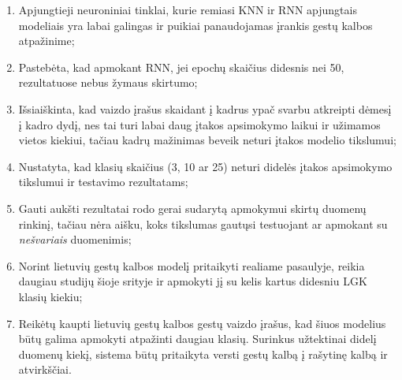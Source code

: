\documentclass{VUMIFPSbakalaurinis}
\begin{document}
\begin{enumerate}
	\item Apjungtieji neuroniniai tinklai, kurie remiasi KNN ir RNN apjungtais modeliais yra labai galingas ir puikiai panaudojamas įrankis gestų kalbos atpažinime;
	\item Pastebėta, kad apmokant RNN, jei epochų skaičius didesnis nei 50, rezultatuose nebus žymaus skirtumo;
	\item Išsiaiškinta, kad vaizdo įrašus skaidant į kadrus ypač svarbu atkreipti dėmesį į kadro dydį, nes tai turi labai daug įtakos apsimokymo laikui ir užimamos vietos kiekiui, tačiau kadrų mažinimas beveik neturi įtakos modelio tikslumui;
	\item Nustatyta, kad klasių skaičius (3, 10 ar 25) neturi didelės įtakos apsimokymo tikslumui ir testavimo rezultatams;
	\item Gauti aukšti rezultatai rodo gerai sudarytą apmokymui skirtų duomenų rinkinį, tačiau nėra aišku, koks tikslumas gautųsi testuojant ar apmokant su \textit{nešvariais} duomenimis;
	\item Norint lietuvių gestų kalbos modelį pritaikyti realiame pasaulyje, reikia daugiau studijų šioje srityje ir apmokyti jį su kelis kartus didesniu LGK klasių kiekiu;
	\item Reikėtų kaupti lietuvių gestų kalbos gestų vaizdo įrašus, kad šiuos modelius būtų galima apmokyti atpažinti daugiau klasių. Surinkus užtektinai didelį duomenų kiekį, sistema būtų pritaikyta versti gestų kalbą į rašytinę kalbą ir atvirkščiai.
\end{enumerate}
%

\printbibliography[heading=bibintoc]  %
\end{document}
